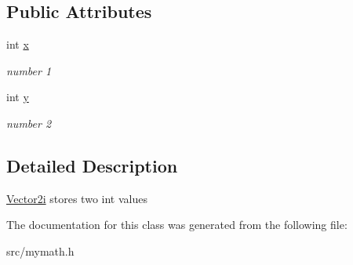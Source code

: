 \subsection*{Public Attributes}
\begin{DoxyCompactItemize}
\item 
\mbox{\label{classCPlantBox_1_1Vector2i_ab1fc92c046d230614a38b2a7ca8e1c0d}} 
int \hyperlink{classCPlantBox_1_1Vector2i_ab1fc92c046d230614a38b2a7ca8e1c0d}{x}
\begin{DoxyCompactList}\small\item\em number 1 \end{DoxyCompactList}\item 
\mbox{\label{classCPlantBox_1_1Vector2i_a309826b5e55e90ba6f1589e6e70cc667}} 
int \hyperlink{classCPlantBox_1_1Vector2i_a309826b5e55e90ba6f1589e6e70cc667}{y}
\begin{DoxyCompactList}\small\item\em number 2 \end{DoxyCompactList}\end{DoxyCompactItemize}


\subsection{Detailed Description}
\hyperlink{classCPlantBox_1_1Vector2i}{Vector2i} stores two int values 

The documentation for this class was generated from the following file\+:\begin{DoxyCompactItemize}
\item 
src/mymath.\+h\end{DoxyCompactItemize}

